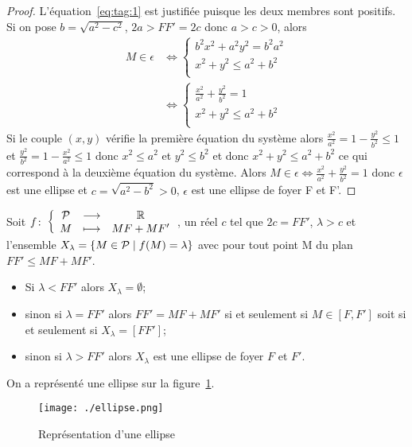 \begin{proof}
L'équation~\eqref{eq:tag:1} est justifiée puisque les deux membres sont positifs. Si on  pose \(b=\sqrt{a^2-c^2}\), \(2a>FF'=2c\) donc \(a>c>0\), alors
\begin{align}
  M \in \epsilon & \iff \begin{cases} b^2x^2 +a^2y^2=b^2a^2 \\ x^2+y^2 \leqslant a^2 +b^2\\\end{cases}\\
  & \iff \begin{cases} \frac{x^2}{a^2} +\frac{y^2}{b^2}=1\\ x^2+y^2 \leqslant a^2 +b^2 \\\end{cases}
\end{align}
Si le couple \((x,y)\) vérifie la première équation du système alors \(\frac{x^2}{a^2}=1-\frac{y^2}{b^2}\leqslant 1\) et \(\frac{y^2}{b^2}=1-\frac{x^2}{a^2} \leqslant 1\) donc \(x^2 \leqslant a^2\) et \(y^2 \leqslant b^2\) et donc \(x^2+y^2 \leqslant a^2+b^2\) ce qui correspond à la deuxième équation du système.
Alors \(M \in \epsilon \iff \frac{x^2}{a^2} +\frac{y^2}{b^2}=1\) donc \(\epsilon\) est une ellipse et \(c=\sqrt{a^2-b^2}>0\), \(\epsilon\) est une ellipse de foyer F et F'.
\end{proof}
Soit \(f\colon \left\{\begin{array}{ccc} \mathcal{P} & \longrightarrow &\mathbb{R}\\ M & \longmapsto & MF+MF' \end{array} \right.\), un réel \(c\) tel que \(2c=FF'\), \(\lambda>c\) et l'ensemble \(X_\lambda=\left\{M \in \mathcal{P}\mathrel{}\middle|\mathrel{}f(M)=\lambda\right\}\) avec pour tout point M du plan \(FF'\leqslant MF+MF'\).
\begin{itemize}
\item Si \(\lambda < FF'\) alors \(X_\lambda=\emptyset\);
\item sinon si \(\lambda=FF'\) alors \(FF'=MF+MF'\) si et seulement si \(M \in [F,F']\) soit si et seulement si \(X_\lambda=[FF']\);
\item sinon si \(\lambda >FF'\) alors \(X_\lambda\) est une ellipse de foyer \(F\) et \(F'\).
\end{itemize}

On a représenté une ellipse sur la figure~\ref{fig:ellipse}.

\begin{figure}[!h]
  \centering
  \texttt{[image: ./ellipse.png]}
  \caption{Représentation d'une ellipse}
  \label{fig:ellipse}
\end{figure}


